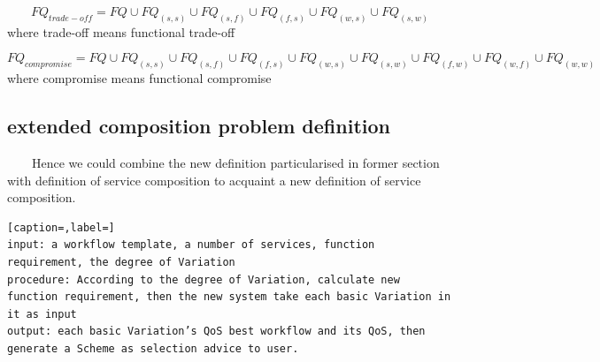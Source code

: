 \documentclass[senior,final,11pt]{iscs-thesis}
\begin{document}
\[FQ_{trade-off} = FQ \cup FQ_{(s,s)} \cup FQ_{(s,f)} \cup FQ_{(f,s)} \cup FQ_{(w,s)} \cup FQ_{(s,w)}\]where trade-off means functional trade-off

\[FQ_{compromise} = FQ \cup FQ_{(s,s)} \cup FQ_{(s,f)} \cup FQ_{(f,s)} \cup FQ_{(w,s)} \cup FQ_{(s,w)} \cup FQ_{(f,w)} \cup FQ_{(w,f)} \cup FQ_{(w,w)}\]where compromise means functional compromise







\subsection{extended composition problem definition}
~~~~Hence we could combine the new definition particularised in former section with definition of service composition to acquaint a new definition of service composition. 
\begin{lstlisting}[caption=,label=]
input: a workflow template, a number of services, function requirement, the degree of Variation
procedure: According to the degree of Variation, calculate new function requirement, then the new system take each basic Variation in it as input
output: each basic Variation’s QoS best workflow and its QoS, then generate a Scheme as selection advice to user.
\end{lstlisting}
\end{document}
